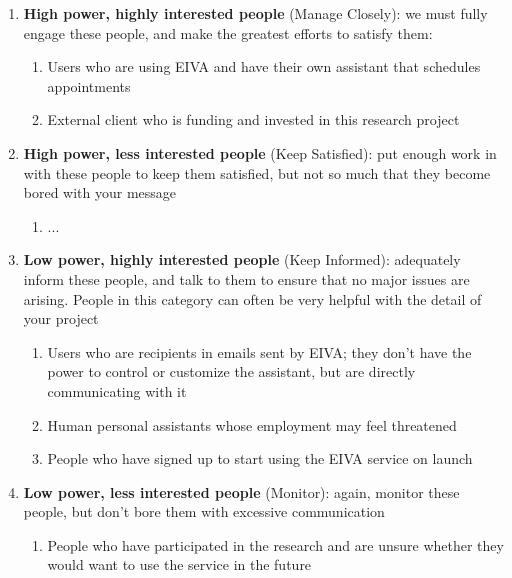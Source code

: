 \documentclass{article}
\begin{document}
\begin{enumerate}
 \item \textbf{High power, highly interested people} (Manage Closely): we must fully engage these people, and make the greatest efforts to satisfy them:
  \begin{enumerate}
    \item Users who are using EIVA and have their own assistant that schedules appointments
    \item External client who is funding and invested in this research project
  \end{enumerate}
 \item \textbf{High power, less interested people} (Keep Satisfied): put enough work in with these people to keep them satisfied, but not so much that they become bored with your message
  \begin{enumerate}
    \item ...
  \end{enumerate}
 \item \textbf{Low power, highly interested people} (Keep Informed): adequately inform these people, and talk to them to ensure that no major issues are arising. People in this category can often be very helpful with the detail of your project
  \begin{enumerate}
    \item Users who are recipients in emails sent by EIVA; they don't have the power to control or customize the assistant, but are directly communicating with it
    \item Human personal assistants whose employment may feel threatened
    \item People who have signed up to start using the EIVA service on launch
  \end{enumerate}
 \item \textbf{Low power, less interested people} (Monitor): again, monitor these people, but don’t bore them with excessive communication
  \begin{enumerate}
    \item People who have participated in the research and are unsure whether they would want to use the service in the future
  \end{enumerate}
\end{enumerate}
\end{document}
